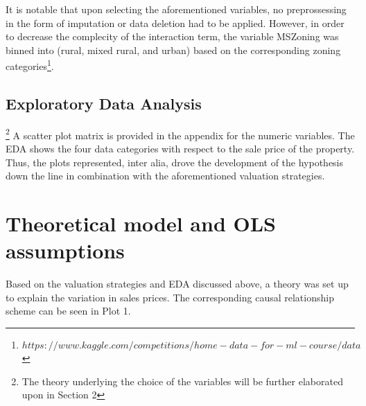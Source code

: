 \documentclass{article}
\begin{document}
It is notable that upon selecting the aforementioned variables, no preprossessing in the form of imputation or data deletion had to be applied. However, in order to decrease the complecity of the interaction term, the variable MSZoning was binned into (rural, mixed rural, and urban) based on the corresponding zoning categories\footnote{$https://www.kaggle.com/competitions/home-data-for-ml-course/data$}.


\subsection{Exploratory Data Analysis}\footnote{The theory underlying the choice of the variables will be further elaborated upon in Section 2}
A scatter plot matrix is provided in the appendix for the numeric variables. The EDA shows the four data categories with respect to the sale price of the property. Thus, the plots represented, inter alia, drove the development of the hypothesis down the line in combination with the aforementioned valuation strategies. 

\section{Theoretical model and OLS assumptions}




\begin{center}
\end{center}


\indent Based on the valuation strategies and EDA discussed above, a theory was set up to explain the variation in sales prices. The corresponding causal relationship scheme can be seen in Plot 1. 
\end{document}
